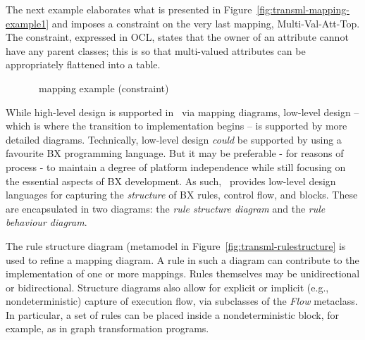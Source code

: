 The next example elaborates what is presented in Figure~\ref{fig:transml-mapping-example1} and imposes a constraint on the very last mapping, Multi-Val-Att-Top. The constraint, expressed in OCL, states that the owner of an attribute cannot have any parent classes; this is so that multi-valued attributes can be appropriately flattened into a table.

\begin{figure}[htbp]
\caption{\transml\ mapping example (constraint)}
\label{fig:architecture-example3}
\end{figure}

While high-level design is supported in \transml\ via mapping diagrams, low-level design -- which is where the transition to implementation begins -- is
supported by more detailed diagrams. Technically, low-level design \textit{could} be supported by using a favourite BX programming language. But it may be preferable - for reasons of process - to maintain a degree of platform independence while still focusing on the essential aspects of BX development. As such, \transml\ provides low-level design languages for capturing the \textit{structure} of BX rules, control flow, and blocks. These are encapsulated in two diagrams: the \textit{rule structure diagram} and the \textit{rule behaviour diagram}.

The rule structure diagram (metamodel in Figure~\ref{fig:transml-rulestructure} is used to refine a mapping diagram. A rule in such a diagram can contribute to the implementation of one or more mappings. Rules themselves may be unidirectional or bidirectional. Structure diagrams also allow for explicit or implicit (e.g., nondeterministic) capture of execution flow, via subclasses of the \textit{Flow} metaclass. In particular, a set of rules can be placed inside a nondeterministic block, for example, as in graph transformation programs.


